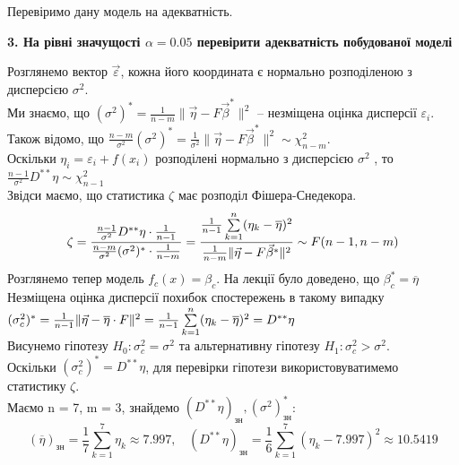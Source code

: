 \documentclass[12 pt]{article}
\begin{document}
Перевіримо дану модель на адекватність. 
\begin{center}
    \textbf{3. На рівні значущості $\alpha=0.05$ перевірити адекватність побудованої моделі}
\end{center}
Розглянемо вектор $\vec{\varepsilon}$, кожна його координата є нормально розподіленою з дисперсією $\sigma^2$.\\
Ми знаємо, що $(\sigma^2)^* = \frac{1}{n-m} \| \vec{\eta} - F \vec{\beta}^* \|^2 $ -- 
незміщена оцінка дисперсії $\varepsilon_i$. \\ 
 Також відомо, що
$\frac{n-m}{\sigma^2} (\sigma^2)^* = \frac{1}{\sigma^2} \| \vec{\eta} - F \vec{\beta}^* \|^2
\sim \chi^2_{n-m}$. \\ 
Оскільки $\eta_i = \varepsilon_i + f(x_i)$ розподілені нормально з дисперсією $\sigma^2$ , то
$\frac{n-1}{\sigma^2} D^{**} \eta \sim \chi^2_{n-1} $ \\ 
Звідси маємо, що статистика $\zeta $ має розподіл Фішера-Снедекора. 
$$
\zeta = \frac
{\frac{n-1}{\sigma^2}D^{**}\eta \cdot \frac{1}{n-1}}
{\frac{n-m}{\sigma^2}(\sigma^2)^* \cdot \frac{1}{n-m}}
=
\frac
{\frac{1}{n-1} \sum_{k=1}^{n}\limits (\eta_k - \overline{\eta})^2}
{\frac{1}{n-m} \| \vec{\eta} - F \vec{\beta}^* \|^2}
\sim F(n-1,n-m)
$$
Розглянемо тепер модель $f_c(x) = \beta_c$. На лекції було доведено, що $\beta^*_c = \overline{\eta}$ \\ 
Незміщена оцінка дисперсії похибок спостережень в такому випадку \\ 
$(\sigma^2_c)^* = \frac{1}{n-1} \| \vec{\eta} - \overline{\eta} \cdot F  \|^2 = 
\frac{1}{n-1} \sum_{k=1}^n\limits(\eta_k - \overline{\eta})^2 = D^{**} \eta
$ \\ 
Висунемо гіпотезу $H_0 : \sigma^2_c = \sigma^2 $ 
та альтернативну гіпотезу $H_1 : \sigma^2_c > \sigma^2$. \\ 
Оскільки $(\sigma^2_c)^* = D^{**} \eta$, для перевірки гіпотези використовуватимемо
статистику $\zeta$. \\ 
Маємо n = 7, m = 3, знайдемо $(D^{**}\eta)_{\text{зн}}, (\sigma^2)^*_{\text{зн}}$: \\ 
$$
(\overline{\eta})_\text{зн} = \frac{1}{7} \sum_{k=1}^7 \eta_k \approx 7.997, \ \ \ \ 
(D^{**} \eta)_{\text{зн}} = \frac{1}{6}\sum_{k=1}^7 (\eta_k - 7.997)^2 \approx 10.5419
$$
\end{document}
